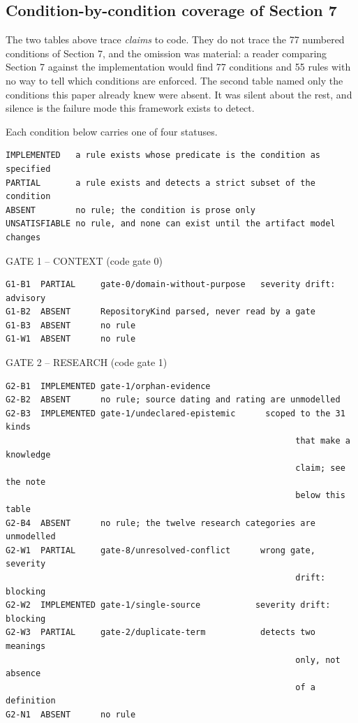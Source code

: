 \documentclass[11pt,a4paper]{article}
\begin{document}
\subsection{Condition-by-condition coverage of Section 7}

The two tables above trace \emph{claims} to code. They do not trace the 77 numbered conditions of Section 7, and the omission was material: a reader comparing Section 7 against the implementation would find 77 conditions and 55 rules with no way to tell which conditions are enforced. The second table named only the conditions this paper already knew were absent. It was silent about the rest, and silence is the failure mode this framework exists to detect.

Each condition below carries one of four statuses.

\begin{Verbatim}[fontsize=\footnotesize,breaklines=true,breakanywhere=true,breakautoindent=false,samepage=false]
IMPLEMENTED   a rule exists whose predicate is the condition as specified
PARTIAL       a rule exists and detects a strict subset of the condition
ABSENT        no rule; the condition is prose only
UNSATISFIABLE no rule, and none can exist until the artifact model changes
\end{Verbatim}

GATE 1 -- CONTEXT (code gate 0)

\begin{Verbatim}[fontsize=\footnotesize,breaklines=true,breakanywhere=true,breakautoindent=false,samepage=false]
G1-B1  PARTIAL     gate-0/domain-without-purpose   severity drift: advisory
G1-B2  ABSENT      RepositoryKind parsed, never read by a gate
G1-B3  ABSENT      no rule
G1-W1  ABSENT      no rule
\end{Verbatim}

GATE 2 -- RESEARCH (code gate 1)

\begin{Verbatim}[fontsize=\footnotesize,breaklines=true,breakanywhere=true,breakautoindent=false,samepage=false]
G2-B1  IMPLEMENTED gate-1/orphan-evidence
G2-B2  ABSENT      no rule; source dating and rating are unmodelled
G2-B3  IMPLEMENTED gate-1/undeclared-epistemic      scoped to the 31 kinds
                                                          that make a knowledge
                                                          claim; see the note
                                                          below this table
G2-B4  ABSENT      no rule; the twelve research categories are unmodelled
G2-W1  PARTIAL     gate-8/unresolved-conflict      wrong gate, severity
                                                          drift: blocking
G2-W2  IMPLEMENTED gate-1/single-source           severity drift: blocking
G2-W3  PARTIAL     gate-2/duplicate-term           detects two meanings
                                                          only, not absence
                                                          of a definition
G2-N1  ABSENT      no rule
\end{Verbatim}
\end{document}
